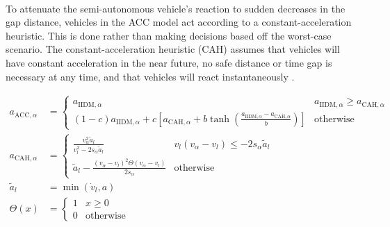 \documentclass[12pt]{article}
\begin{document}
\paragraph{}
To attenuate the semi-autonomous vehicle's reaction to sudden decreases in the gap distance, vehicles in the ACC model act according to a constant-acceleration heuristic. This is done rather than making decisions based off the worst-case scenario.  The constant-acceleration heuristic (CAH) assumes that vehicles will have constant acceleration in the near future, no safe distance or time gap is necessary at any time, and that vehicles will react instantaneously \cite[Chapter~11]{treiber_kesting_2013}.
\begin{mymathbox}[ams gather, title=ACC Governing Functions, colframe=blue!30!black]
  \begin{align}
  a_{\text{ACC},\alpha}&= 
  \begin{cases}
  a_{\text{IIDM},\alpha} & a_{\text{IIDM},\alpha} \ge a_{\text{CAH},\alpha}\\
  (1-c)a_{\text{IIDM},\alpha} + c\left[a_{\text{CAH},\alpha} + b \tanh(\frac{a_{\text{IIDM},\alpha}-a_{\text{CAH},\alpha}}{b}) \right] & \text{otherwise}
  \end{cases}\\
  a_{\text{CAH},\alpha}&= 
  \begin{cases}
  \frac{v_\alpha^2\tilde{a}_l}{v_l^2 - 2 s_\alpha\tilde{a}_l} & v_l(v_\alpha-v_l) \le -2s_\alpha\tilde{a}_l\\
  \tilde{a}_l - \frac{(v_\alpha-v_l)^2 \Theta (v_\alpha-v_l)}{2s_\alpha} & \text{otherwise}
  \end{cases}\\
  \tilde{a}_l &= \min(\dot{v}_l, a)\\
   \Theta (x)&= 
   \begin{cases}
   1 & x\geq 0\\
   0 & \text{otherwise}
   \end{cases}
   \end{align}
\end{mymathbox}
\end{document}
